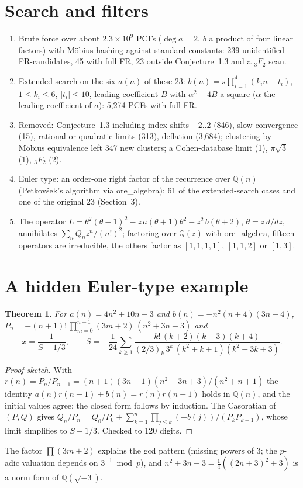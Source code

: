 \documentclass[11pt]{article}
\newtheorem{theorem}{Theorem}
\begin{document}
\section{Search and filters}
\begin{enumerate}
\item Brute force over about $2.3\times10^9$ PCFs ($\deg a=2$, $b$ a product of four linear factors) with M\"obius hashing against
standard constants: 239 unidentified FR-candidates, 45 with full FR, 23 outside Conjecture~1.3 and a ${}_3F_2$ scan.
\item Extended search on the six $a(n)$ of these 23: $b(n)=s\prod_{i=1}^4(k_in+t_i)$, $1\le k_i\le6$, $|t_i|\le10$, leading
coefficient $B$ with $\alpha^2+4B$ a square ($\alpha$ the leading coefficient of $a$): 5,274 PCFs with full FR.
\item Removed: Conjecture~1.3 including index shifts $-2..2$ (846), slow convergence (15), rational or quadratic limits (313),
deflation (3,684); clustering by M\"obius equivalence left 347 new clusters; a Cohen-database limit (1), $\pi\sqrt3$ (1), ${}_3F_2$ (2).
\item Euler type: an order-one right factor of the recurrence over $\mathbb Q(n)$ (Petkov\v sek's algorithm via ore\_algebra):
61 of the extended-search cases and one of the original 23 (Section~3).
\item The operator $L=\theta^2(\theta-1)^2-z\,a(\theta+1)\theta^2-z^2\,b(\theta+2)$, $\theta=z\,d/dz$, annihilates
$\sum_n Q_nz^n/(n!)^2$; factoring over $\mathbb Q(z)$ with ore\_algebra, fifteen operators are irreducible, the others factor as
$[1,1,1,1]$, $[1,1,2]$ or $[1,3]$.
\end{enumerate}

\section{A hidden Euler-type example}
\begin{theorem}
For $a(n)=4n^2+10n-3$ and $b(n)=-n^2(n+4)(3n-4)$,
$P_n=-(n+1)!\,\prod_{m=0}^{n-1}(3m+2)\,(n^2+3n+3)$ and
\[x=\frac{1}{S-1/3},\qquad S=-\frac1{24}\sum_{k\ge1}\frac{k!\,(k+2)(k+3)(k+4)}{(2/3)_k\,3^k\,(k^2+k+1)(k^2+3k+3)} .\]
\end{theorem}
\begin{proof}[Proof sketch]
With $r(n)=P_n/P_{n-1}=(n+1)(3n-1)(n^2+3n+3)/(n^2+n+1)$ the identity $a(n)r(n-1)+b(n)=r(n)r(n-1)$ holds in $\mathbb Q(n)$, and the
initial values agree; the closed form follows by induction. The Casoratian of $(P,Q)$ gives
$Q_n/P_n=Q_0/P_0+\sum_{k=1}^{n}\prod_{j\le k}(-b(j))/(P_kP_{k-1})$, whose limit simplifies to $S-1/3$. Checked to 120 digits.
\end{proof}
The factor $\prod(3m+2)$ explains the gcd pattern (missing powers of $3$; the $p$-adic valuation depends on $3^{-1}\bmod p$), and
$n^2+3n+3=\tfrac14((2n+3)^2+3)$ is a norm form of $\mathbb Q(\sqrt{-3})$.
\end{document}
